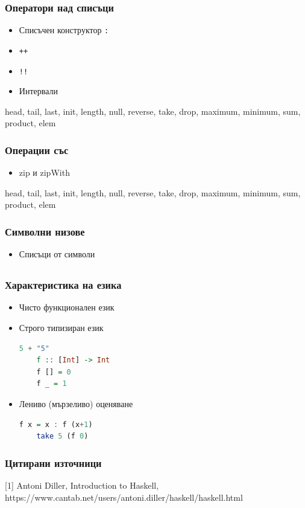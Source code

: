\documentclass{beamer}
\begin{document}
\begin{frame}[fragile]
  \frametitle{Оператори над списъци}

  \begin{itemize}
    \item Списъчен конструктор \verb|:|
    \item \verb|++|
    \item \verb|!!|
    \item Интервали
  \end{itemize}

  \bigskip

  head, tail, last, init, length, null, reverse, take, drop, maximum, minimum, sum, product, elem

\end{frame}

\begin{frame}[fragile]
  \frametitle{Операции със}

  \begin{itemize}
    \item zip и zipWith
  \end{itemize}

  \bigskip

  head, tail, last, init, length, null, reverse, take, drop, maximum, minimum, sum, product, elem

\end{frame}


\begin{frame}[fragile]
  \frametitle{Символни низове}

  \begin{itemize}
    \item Списъци от символи
  \end{itemize}

  \bigskip
  

\end{frame}



\subsection{}


\begin{frame}[fragile]
  \frametitle{Характеристика на езика}
  
\begin{itemize}
  \item Чисто функционален език
  \item Строго типизиран език
  \begin{lstlisting}[basicstyle=\small, language=Haskell]
    5 + "5"
    f :: [Int] -> Int
    f [] = 0
    f _ = 1
    \end{lstlisting}
  \item Лениво (мързеливо) оценяване
  \begin{lstlisting}[basicstyle=\small, language=Haskell]
    f x = x : f (x+1)
    take 5 (f 0)
  \end{lstlisting}
\end{itemize}


\end{frame}


\begin{frame}[fragile]
  \frametitle{Цитирани източници}

    [1] Antoni Diller, Introduction to Haskell, 
        https://www.cantab.net/users/antoni.diller/haskell/haskell.html
\end{frame}



\end{document}
